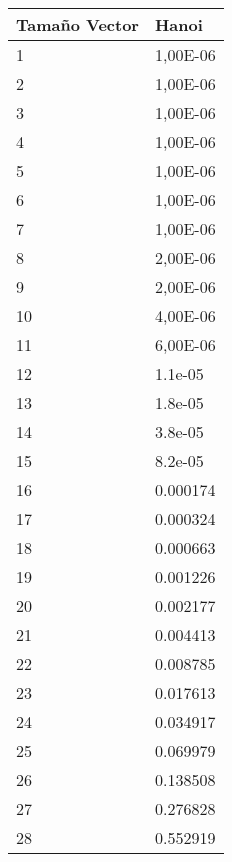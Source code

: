 \documentclass[a4paper, 11pt]{article}
\begin{document}
\begin{tabular}{@{}ll@{}}
\toprule
Tamaño Vector & Hanoi    \\ \midrule
1             & 1,00E-06 \\
2             & 1,00E-06 \\
3             & 1,00E-06 \\
4             & 1,00E-06 \\
5             & 1,00E-06 \\
6             & 1,00E-06 \\
7             & 1,00E-06 \\
8             & 2,00E-06 \\
9             & 2,00E-06 \\
10            & 4,00E-06 \\
11            & 6,00E-06 \\
12            & 1.1e-05  \\
13            & 1.8e-05  \\
14            & 3.8e-05  \\
15            & 8.2e-05  \\
16            & 0.000174 \\
17            & 0.000324 \\
18            & 0.000663 \\
19            & 0.001226 \\
20            & 0.002177 \\
21            & 0.004413 \\
22            & 0.008785 \\
23            & 0.017613 \\
24            & 0.034917 \\
25            & 0.069979 \\
26            & 0.138508 \\
27            & 0.276828 \\
28            & 0.552919 \\ \bottomrule
\end{tabular}
\end{document}
